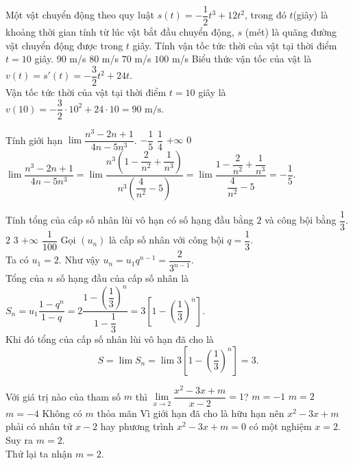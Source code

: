 \begin{ex}%
 Một vật chuyển động theo quy luật $s(t) = -\dfrac{1}{2} t^3 + 12t^2$, trong đó $t$(giây) là khoảng thời gian tính từ lúc vật bắt đầu chuyển động, $s$ (mét) là quãng đường vật chuyển động được trong $t$ giây. Tính vận tốc tức thời của vật tại thời điểm $t = 10$ giây.
 \choice
  {\True $90$ m/s}
  {$80$ m/s}
  {$70$ m/s}
  {$100$ m/s}
 \loigiai
  {
  Biểu thức vận tốc của vật là $v(t) = s'(t) = -\dfrac{3}{2}t^2 + 24 t$.\\
  Vận tốc tức thời của vật tại thời điểm $t = 10$ giây là $v(10) = -\dfrac{3}{2} \cdot 10^2 + 24 \cdot 10 = 90 \textrm{ m/s}$.
  }
\end{ex}

\begin{ex}%
 Tính giới hạn $\lim \dfrac{n^3 - 2n + 1}{4n - 5n^3}$.
 \choice
  {\True $-\dfrac{1}{5}$}
  {$\dfrac{1}{4}$}
  {$+\infty$}
  {$0$}
 \loigiai
  {
  $\lim \dfrac{n^3 - 2n + 1}{4n - 5n^3} = \lim \dfrac{n^3 \left( 1 - \dfrac{2}{n^2} + \dfrac{1}{n^3} \right)}{n^3 \left( \dfrac{4}{n^2} - 5 \right)} = \lim \dfrac{1 - \dfrac{2}{n^2} + \dfrac{1}{n^3}}{\dfrac{4}{n^2} - 5} = -\dfrac{1}{5}$.
  }
\end{ex}

\begin{ex}%
 Tính tổng của cấp số nhân lùi vô hạn có số hạng đầu bằng $2$ và công bội bằng $\dfrac{1}{3}$.
 \choice
  {$2$}
  {\True $3$}
  {$+\infty$}
  {$\dfrac{1}{100}$}
 \loigiai
  {
  Gọi $(u_n)$ là cấp số nhân với công bội $q = \dfrac{1}{3}$.\\
  Ta có $u_1 = 2$. Như vậy $u_n = u_1q^{n-1} = \dfrac{2}{3^{n-1}}$.\\
  Tổng của $n$ số hạng đầu của cấp số nhân là $S_n = u_1\dfrac{1-q^n}{1-q} = 2\dfrac{1 - \left(\dfrac{1}{3}\right)^n}{1 - \dfrac{1}{3}} = 3\left[1 - \left(\dfrac{1}{3}\right)^n\right]$.\\
  Khi đó tổng của cấp số nhân lùi vô hạn đã cho là
  $$S = \lim S_n = \lim 3\left[1 - \left(\dfrac{1}{3}\right)^n\right] = 3.$$
  }
\end{ex}

\begin{ex}%
 Với giá trị nào của tham số $m$ thì $\lim\limits_{x \to 2}\dfrac{x^2-3x+m}{x-2} = 1$?
 \choice
  {$m=-1$}
  {\True $m=2$}
  {$m=-4$}
  {Không có $m$ thỏa mãn}
 \loigiai
  {
  Vì giới hạn đã cho là hữu hạn nên $x^2 - 3x + m$ phải có nhân tử $x-2$ hay phương trình $x^2 - 3x + m = 0$ có một nghiệm $x = 2$. Suy ra $m = 2$.\\
  Thử lại ta nhận $m = 2$.
  }
\end{ex}


